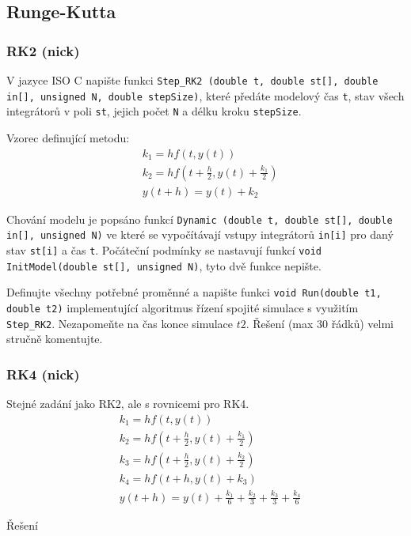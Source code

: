 \documentclass[11pt]{article} %
\begin{document}
\newpage
\subsection{Runge-Kutta}
\subsubsection{RK2 (nick)}
V jazyce ISO C napište funkci \texttt{Step\_RK2 (double t, double st[], double in[], unsigned N, double stepSize)}, které předáte modelový čas \texttt{t}, stav všech integrátorů v poli \texttt{st}, jejich počet \texttt{N} a délku kroku \texttt{stepSize}.

\noindent
Vzorec definující metodu:
\begin{align}
&k_1 = hf(t, y(t))\\
&k_2 = hf(t + \frac{h}{2}, y(t) + \frac{k_1}{2})\\
&y(t+h) = y(t) + k_2
\end{align}

\noindent
Chování modelu je popsáno funkcí \texttt{Dynamic (double t, double st[], double in[], unsigned N)} ve které se vypočítávají vstupy integrátorů \texttt{in[i]} pro daný stav \texttt{st[i]} a čas \texttt{t}. Počáteční podmínky se nastavují funkcí \texttt{void InitModel(double st[], unsigned N)}, tyto dvě funkce nepište.


\noindent
Definujte všechny potřebné proměnné a napište funkci \texttt{void Run(double t1, double t2)} implementující algoritmus řízení spojité simulace s využitím \texttt{Step\_RK2}. Nezapomeňte  na čas konce simulace $t2$. Řešení (max 30 řádků) velmi stručně komentujte.


\newpage
\subsubsection{RK4 (nick)}
Stejné zadání jako RK2, ale s rovnicemi pro RK4.
\begin{align}
&k_1 = hf(t, y(t))\\
&k_2 = hf(t + \frac{h}{2}, y(t) + \frac{k_1}{2})\\
&k_3 = hf(t + \frac{h}{2}, y(t) + \frac{k_2}{2})\\
&k_4 = hf(t + h, y(t) + k_3)\\
&y(t+h) = y(t) + \frac{k_1}{6} + \frac{k_2}{3} + \frac{k_3}{3} + \frac{k_4}{6}
\end{align}

\noindent
Řešení

\end{document}

